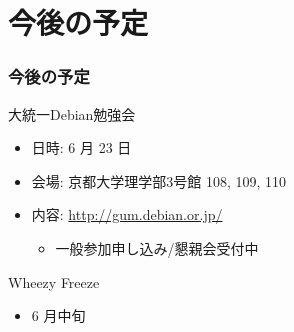 \documentclass[cjk,dvipdfmx,10pt,%
hyperref={bookmarks=true,bookmarksnumbered=true,bookmarksopen=false,%
colorlinks=false,%
pdftitle={第 59 回 関西 Debian 勉強会},%
pdfauthor={倉敷・のがた・かわだ・佐々木},%
pdfsubject={資料},%
}]{beamer}
\begin{document}
\section{今後の予定}
\begin{frame}[fragile]
\frametitle{今後の予定}

\begin{block}{大統一Debian勉強会}
\begin{itemize}
  \item 日時: 6 月 23 日
  \item 会場: 京都大学理学部3号館 108, 109, 110
  \item 内容: 
    \url{http://gum.debian.or.jp/}
    \begin{itemize}
    \item 一般参加申し込み/懇親会受付中
    \end{itemize}
\end{itemize}
\end{block}

\begin{block}{Wheezy Freeze}
\begin{itemize}
  \item 6 月中旬
\end{itemize}
\end{block}

\end{frame}



\takahashi[50]{  }
\end{document}
